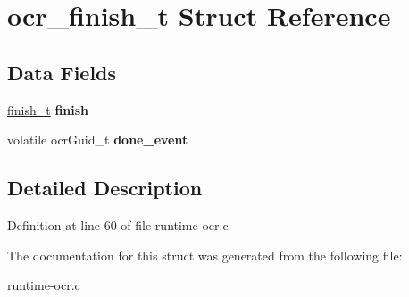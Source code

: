 \hypertarget{structocr__finish__t}{\section{ocr\-\_\-finish\-\_\-t Struct Reference}
\label{structocr__finish__t}
}
\subsection*{Data Fields}
\begin{DoxyCompactItemize}
\item 
\hypertarget{structocr__finish__t_ae2d3c1386d3c7c84b33b5b4839d1885c}{\hyperlink{structfinish__t}{finish\-\_\-t} {\bfseries finish}}\label{structocr__finish__t_ae2d3c1386d3c7c84b33b5b4839d1885c}

\item 
\hypertarget{structocr__finish__t_a1b74844b2af21ddca23cae52bdd826dd}{volatile ocr\-Guid\-\_\-t {\bfseries done\-\_\-event}}\label{structocr__finish__t_a1b74844b2af21ddca23cae52bdd826dd}

\end{DoxyCompactItemize}


\subsection{Detailed Description}


Definition at line 60 of file runtime-\/ocr.\-c.



The documentation for this struct was generated from the following file\-:\begin{DoxyCompactItemize}
\item 
runtime-\/ocr.\-c\end{DoxyCompactItemize}
